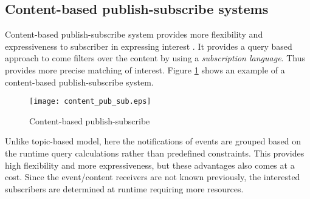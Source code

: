 \subsection{Content-based publish-subscribe systems}

Content-based publish-subscribe system provides more flexibility \parencite{Aguilera:1999:MEC:301308.301326} and expressiveness to subscriber in expressing interest \parencite{Shen2010}. It provides a query based approach to come filters over the content by using a \textit {subscription language}. Thus provides more precise matching of interest. Figure \ref{figures:content_pub_sub} shows an example of a content-based publish-subscribe system.

    \makeatletter
    \setlength{\intextsep}{20pt}
    \makeatother

    \begin{figure}[h!]
    \centering
    \texttt{[image: content\_pub\_sub.eps]}
    \caption{Content-based publish-subscribe}\label{figures:content_pub_sub}
    \end{figure}

Unlike topic-based model, here the notifications of events are grouped based on the runtime query calculations rather than predefined constraints. This provides high flexibility and more expressiveness, but these advantages also comes at a cost. Since the event/content receivers are not known previously, the interested subscribers are determined at runtime requiring more resources.  

